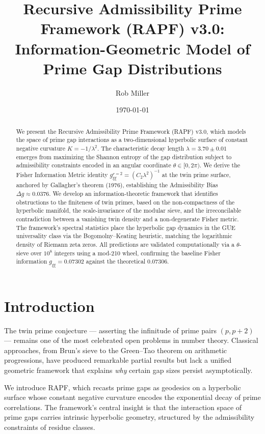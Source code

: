 \documentclass[12pt]{article}
\title{Recursive Admissibility Prime Framework (RAPF) v3.0:\\
Information-Geometric Model of Prime Gap Distributions}
\author{Rob Miller}
\date{\today}
\begin{document}
\maketitle

\begin{abstract}
We present the Recursive Admissibility Prime Framework (RAPF) v3.0, which
models the space of prime gap interactions as a two-dimensional hyperbolic
surface of constant negative curvature $K = -1/\lambda^2$. The characteristic
decay length $\lambda = 3.70 \pm 0.01$ emerges from maximizing the Shannon
entropy of the gap distribution subject to admissibility constraints encoded
in an angular coordinate $\theta \in [0, 2\pi)$. We derive the Fisher
Information Metric identity $g_{\xi\xi}^{r=2} = (C_2 \lambda^2)^{-1}$ at the
twin prime surface, anchored by Gallagher's theorem (1976), establishing the
Admissibility Bias $\Delta g \approx 0.0376$. We develop an
information-theoretic framework that identifies obstructions to the finiteness
of twin primes, based on the non-compactness of the hyperbolic manifold, the
scale-invariance of the modular sieve, and the irreconcilable contradiction
between a vanishing twin density and a non-degenerate Fisher metric. The
framework's spectral statistics place the hyperbolic gap dynamics in the GUE
universality class via the Bogomolny--Keating heuristic, matching the
logarithmic density of Riemann zeta zeros. All predictions are validated
computationally via a $\theta$-sieve over $10^8$ integers using a mod-210
wheel, confirming the baseline Fisher information $g_{\xi\xi} = 0.07302$
against the theoretical $0.07306$.
\end{abstract}

\tableofcontents
\newpage

\section{Introduction}

The twin prime conjecture --- asserting the infinitude of prime pairs $(p, p+2)$
--- remains one of the most celebrated open problems in number theory. Classical
approaches, from Brun's sieve to the Green--Tao theorem on arithmetic progressions,
have produced remarkable partial results but lack a unified geometric framework that
explains \textit{why} certain gap sizes persist asymptotically.

We introduce RAPF, which recasts prime gaps as geodesics on a hyperbolic surface
whose constant negative curvature encodes the exponential decay of prime
correlations. The framework's central insight is that the interaction space of
prime gaps carries intrinsic hyperbolic geometry, structured by the admissibility
constraints of residue classes.
\end{document}
